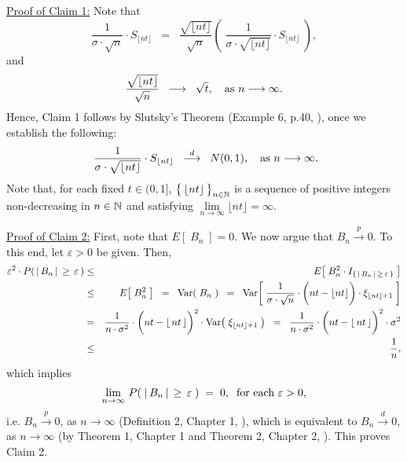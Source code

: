 \begin{enumerate}
		\vskip 0.5cm
		\noindent
		\underline{Proof of Claim 1:}\quad
		Note that
		\begin{equation*}
		\dfrac{1}{\sigma\cdot\sqrt{n}} \cdot S_{\lfloor nt \rfloor}
		\;\; = \;\;
		\dfrac{\sqrt{\lfloor nt \rfloor}}{\sqrt{n}} \left(\;\dfrac{1}{\sigma\cdot\sqrt{\lfloor nt \rfloor}} \cdot S_{\lfloor nt \rfloor}\;\right),
		\end{equation*}
		and
		\begin{equation*}
		\dfrac{\sqrt{\lfloor nt \rfloor}}{\sqrt{n}}
		\;\; \longrightarrow \;\; \sqrt{t},
		\quad
		\textnormal{as $n \longrightarrow \infty$}.
		\end{equation*}
		Hence, Claim 1 follows by Slutsky's Theorem (Example 6, p.40, \cite{Ferguson1996}),
		once we establish the following:
		\begin{equation*}
		\;\dfrac{1}{\sigma\cdot\sqrt{\lfloor nt \rfloor}} \cdot S_{\lfloor nt \rfloor}
		\;\; \overset{d}{\longrightarrow} \;\; N(0,1),
		\quad
		\textnormal{as $n \longrightarrow \infty$}.
		\end{equation*}
		Note that, for each fixed $t \in (0,1]$, $\left\{\,\lfloor \overset{{\color{white}~}}{nt} \rfloor\,\right\}_{n\in\N}$ is a sequence of positive integers
		non-decreasing in $n \in \mathbb{N}$ and satisfying $\underset{n\rightarrow\infty}{\lim}\lfloor nt \rfloor = \infty$.
		

		\vskip 0.5cm
		\noindent
		\underline{Proof of Claim 2:}\quad
		First, note that $E\!\left[\;B_{n}\;\right] = 0$.
		We now argue that $B_{n} \overset{p}{\longrightarrow} 0$.
		To this end, let $\varepsilon > 0$ be given.
		Then,
		\begin{eqnarray*}
		\varepsilon^{2} \cdot P\!\left(\,\vert\,B_{n}\,\vert\,\geq\,\varepsilon\,\right)
		&\leq& E\!\left[\;B^{2}_{n} \cdot I_{\{\,\vert\,B_{n}\,\vert\,\geq\,\varepsilon\,\}}\;\right]
		\\
		&\leq& E\!\left[\;B_{n}^{2}\;\right]
		\;\;=\;\; \Var\!\left(\;B_{n}\;\right)
		\;\;=\;\;
			\Var\!\left[\;
				\dfrac{1}{\sigma\cdot\sqrt{n}}
				\cdot
				\left(\overset{{\color{white}1}}{nt} - \lfloor nt \rfloor\right)
				\cdot
				\xi_{\lfloor nt \rfloor + 1}
			\;\right]
		\\
		&=&
			\dfrac{1}{n\cdot\sigma^{2}}
			\cdot
			\left(\overset{{\color{white}1}}{nt} - \lfloor\,nt\,\rfloor\right)^{2}
			\cdot
			\Var\!\left(\;\xi_{\lfloor nt \rfloor + 1}\;\right)
		\;\;=\;\;
			\dfrac{1}{n\cdot\sigma^{2}}
			\cdot
			\left(\overset{{\color{white}1}}{nt} - \lfloor\,nt\,\rfloor\right)^{2}
			\cdot
			\sigma^{2}
		\\
		&\leq& \dfrac{1}{n},
		\end{eqnarray*}
		which implies
		\begin{equation*}
		\lim_{n\rightarrow\infty}\,P\!\left(\;\vert\,B_{n}\,\vert\,\geq\,\varepsilon\;\right) \; = \; 0,
		\;\;
		\textnormal{for each $\varepsilon > 0$},
		\end{equation*}
		i.e. $B_{n}\overset{p}{\longrightarrow}0$, as $n\longrightarrow\infty$
		(Definition 2, Chapter 1, \cite{Ferguson1996}),
		which is equivalent to $B_{n}\overset{d}{\longrightarrow}0$, as $n\longrightarrow\infty$
		(by Theorem 1, Chapter 1 and Theorem 2, Chapter 2, \cite{Ferguson1996}).
		This proves Claim 2.
		

\end{enumerate}
